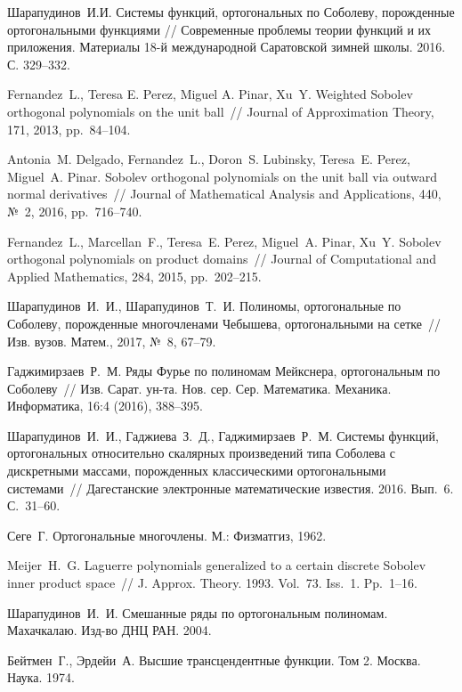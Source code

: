 \begin{thebibliography}{111}
{Шарапудинов~И.И.}
Системы функций, ортогональных по Соболеву, порожденные ортогональными функциями //
Современные проблемы теории функций и их приложения.  Материалы 18-й международной Саратовской зимней школы. 2016. С. 329--332.


{Fernandez~L., Teresa E. Perez, Miguel A. Pinar, Xu~Y.} Weighted Sobolev orthogonal polynomials on the unit ball~// Journal of Approximation Theory, 171, 2013, pp.~84--104.


{Antonia~M. Delgado, Fernandez~L., Doron~S. Lubinsky, Teresa~E. Perez, Miguel~A. Pinar.} Sobolev orthogonal polynomials on the unit ball via outward normal derivatives~// Journal of Mathematical Analysis and Applications, 440, №~2, 2016, pp.~716--740.


{Fernandez~L., Marcellan~F., Teresa~E. Perez, Miguel~A. Pinar, Xu~Y.} Sobolev orthogonal polynomials on product domains~// Journal of Computational and Applied Mathematics, 284, 2015, pp.~202--215.


{Шарапудинов~И.~И., Шарапудинов~Т.~И.} Полиномы, ортогональные по Соболеву, порожденные многочленами Чебышева, ортогональными на сетке~// Изв. вузов. Матем., 2017, №~8, 67--79.


{Гаджимирзаев~Р.~М.} Ряды Фурье по полиномам Мейкснера, ортогональным по Соболеву~// Изв. Сарат. ун-та. Нов. сер. Сер. Математика. Механика. Информатика, 16:4 (2016), 388--395.


{Шарапудинов~И.~И., Гаджиева~З.~Д., Гаджимирзаев~Р.~М.} Системы функций, ортогональных относительно скалярных произведений типа Соболева с дискретными массами, порожденных классическими ортогональными системами~// Дагестанские электронные математические известия. 2016. Вып.~6. С.~31--60.


{Сеге~Г.} Ортогональные многочлены. М.: Физматгиз, 1962.

Meijer~H.~G. Laguerre polynomials generalized to a certain discrete Sobolev inner product space~// J. Approx. Theory. 1993. Vol.~73. Iss.~1. Pp.~1--16.

Шарапудинов~И.~И. Смешанные ряды по ортогональным полиномам. Махачкалаю. Изд-во ДНЦ РАН. 2004.

Бейтмен~Г., Эрдейи~А. Высшие трансцендентные функции. Том 2. Москва. Наука. 1974.


\end{thebibliography}
